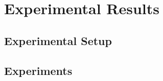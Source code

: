 \section{Experimental Results}
\label{sec:exp}
\subsection{Experimental Setup}
\subsection{Experiments}